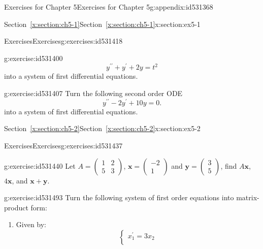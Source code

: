 \documentclass[oneside,10pt,]{book}
\newcommand{\xreffont}{\relax}
\numberwithin{equation}{section}
\numberwithin{equation}{section}
\newcommand{\amp}{&}
\begin{document}
\begin{appendixptx}{Exercises for Chapter 5}{}{Exercises for Chapter 5}{}{}{g:appendix:id531368}
\begin{sectionptx}{Section~{\xreffont\ref*{x:section:ch5-1}}}{}{Section~{\xreffont\ref*{x:section:ch5-1}}}{}{}{x:section:ex5-1}
\begin{exercises-subsection-numberless}{Exercises}{}{Exercises}{}{}{g:exercises:id531418}
\begin{divisionexercise}{3}{}{}{g:exercise:id531400}
\begin{equation*}
y^{\prime\prime}+y^{\prime}+2y=t^{2}
\end{equation*}
into a system of first differential equations.%
\end{divisionexercise}%
\begin{divisionexercise}{4}{}{}{g:exercise:id531407}%
Turn the following second order ODE%
\begin{equation*}
y^{\prime\prime}-2y^{\prime}+10y=0.
\end{equation*}
into a system of first differential equations.%
\end{divisionexercise}%
\end{exercises-subsection-numberless}
\end{sectionptx}
%
%
\typeout{************************************************}
\typeout{Section F.2 Section~{\xreffont\ref*{x:section:ch5-2}}}
\typeout{************************************************}
%
\begin{sectionptx}{Section~{\xreffont\ref*{x:section:ch5-2}}}{}{Section~{\xreffont\ref*{x:section:ch5-2}}}{}{}{x:section:ex5-2}
%
%
\typeout{************************************************}
\typeout{************************************************}
%
\begin{exercises-subsection-numberless}{Exercises}{}{Exercises}{}{}{g:exercises:id531437}
\begin{divisionexercise}{1}{}{}{g:exercise:id531440}%
Let \(A=\left(\begin{array}{cc}
1 \amp 2\\
5 \amp 3
\end{array}\right)\), \(\mathbf{x}=\left(\begin{array}{c}
-2\\
1
\end{array}\right)\) and \(\mathbf{y}=\left(\begin{array}{c}
3\\
5
\end{array}\right)\), find \(A\mathbf{x}\), \(4\mathbf{x}\), and \(\mathbf{x}+\mathbf{y}\).%
\end{divisionexercise}%
\begin{divisionexercise}{2}{}{}{g:exercise:id531493}%
Turn the following system of first order equations into matrix-product form:%
%
\begin{enumerate}[label=(\alph*)]
\item{}Given by:%
\begin{equation*}
\begin{cases}
x_{1}^{\prime}=3x_{2}\\

\end{cases}
\end{equation*}
\end{enumerate}
\end{divisionexercise}
\end{exercises-subsection-numberless}
\end{sectionptx}
\end{appendixptx}
\end{document}
